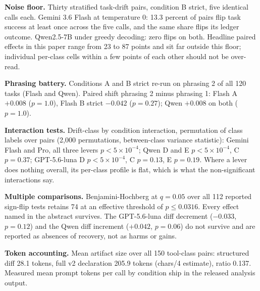 \textbf{Noise floor.} Thirty stratified task-drift pairs, condition B strict, five identical calls each. Gemini 3.6 Flash at temperature 0: 13.3 percent of pairs flip task success at least once across the five calls, and the same share flips its ledger outcome. Qwen2.5-7B under greedy decoding: zero flips on both. Headline paired effects in this paper range from 23 to 87 points and sit far outside this floor; individual per-class cells within a few points of each other should not be over-read.

\textbf{Phrasing battery.} Conditions A and B strict re-run on phrasing 2 of all 120 tasks (Flash and Qwen). Paired shift phrasing 2 minus phrasing 1: Flash A $+0.008$ ($p{=}1.0$), Flash B strict $-0.042$ ($p{=}0.27$); Qwen $+0.008$ on both ($p{=}1.0$).

\textbf{Interaction tests.} Drift-class by condition interaction, permutation of class labels over pairs (2,000 permutations, between-class variance statistic): Gemini Flash and Pro, all three levers $p < 5\times10^{-4}$; Qwen D and E $p < 5\times10^{-4}$, C $p{=}0.37$; GPT-5.6-luna D $p < 5\times10^{-4}$, C $p{=}0.13$, E $p{=}0.19$. Where a lever does nothing overall, its per-class profile is flat, which is what the non-significant interactions say.

\textbf{Multiple comparisons.} Benjamini-Hochberg at $q{=}0.05$ over all 112 reported sign-flip tests retains 74 at an effective threshold of $p \le 0.0316$. Every effect named in the abstract survives. The GPT-5.6-luna diff decrement ($-0.033$, $p{=}0.12$) and the Qwen diff increment ($+0.042$, $p{=}0.06$) do not survive and are reported as absences of recovery, not as harms or gains.

\textbf{Token accounting.} Mean artifact size over all 150 tool-class pairs: structured diff 28.1 tokens, full v2 declaration 205.9 tokens (chars/4 estimate), ratio 0.137. Measured mean prompt tokens per call by condition ship in the released analysis output.
